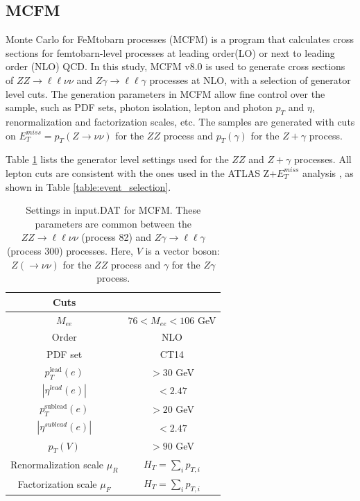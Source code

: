 \documentclass[11pt,a4paper,openright,twoside]{report}
\newcommand{\ZZ}{$ZZ\to \ell\ell\nu\nu$ }
\newcommand{\Zg}{$Z\gamma\to \ell\ell\gamma$ }
\begin{document}
\subsection{MCFM}
Monte Carlo for FeMtobarn processes (MCFM) is a program that calculates cross sections for femtobarn-level processes at leading order(LO) or next to leading order (NLO) QCD. In this study, MCFM v8.0 \cite{MCFM1, MCFM2, MCFM3, MCFM} is used to generate cross sections of \ZZ and \Zg processes at NLO, with a selection of generator level cuts. The generation parameters in MCFM allow fine control over the sample, such as PDF sets, photon isolation, lepton and photon $p_T$ and $\eta$, renormalization and factorization scales, etc. The samples are generated with cuts on $E_T^{miss} = p_T(Z\to \nu\nu)$ for the $ZZ$ process and $p_T(\gamma)$ for the $Z+\gamma$ process. 

Table \ref{table:default} lists the generator level settings used for the $ZZ$ and $Z+\gamma$ processes. All lepton cuts are consistent with the ones used in the ATLAS Z+$E_T^{miss}$ analysis \cite{ZH_ATLAS}, as shown in Table \ref{table:event_selection}.
{\renewcommand{\arraystretch}{1.5}
\begin{table}[H]
\centering
	\begin{tabular}{c c}
	\hline
	\hline
	\textbf{Cuts} &\\
	\hline
	$M_{ee}$ & $76 < M_{ee} < 106$ GeV\\
	\hline
	Order & NLO \\
	\hline
	PDF set & CT14\\
	\hline
	$p_T^{\text{lead}}(e)$ & $> 30$ GeV \\
	\hline
	$|\eta^{lead}(e)|$ & $< 2.47$\\
	\hline
	$p_T^{\text{sublead}}(e)$ & $> 20$ GeV\\
	\hline
	$|\eta^{sublead}(e)|$ & $< 2.47$\\
	\hline
	$p_T(V)$\footnotemark & $> 90$ GeV\\
	\hline
	Renormalization scale $\mu_R$& $H_T = \sum_{i}p_{T,i}$\\
	\hline
	Factorization scale $\mu_F$& $H_T = \sum_{i}p_{T,i}$\\
	\hline
	\hline
	\end{tabular}
	\caption{Settings in input.DAT for MCFM. These parameters are common between the \ZZ (process 82) and \Zg (process 300) processes. Here, $V$ is a vector boson: $Z(\to\nu\nu)$ for the $ZZ$ process and $\gamma$ for the $Z\gamma$ process.}
	\label{table:default}
\end{table}
}
\vfill
\end{document}
